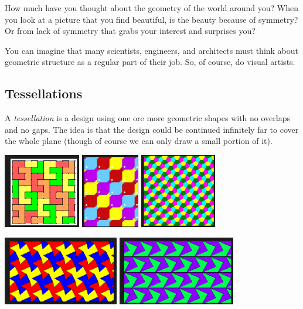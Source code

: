 How much have you thought about the geometry of the world around you?  When you look at a picture that you find beautiful, is the beauty because of symmetry?  Or from lack of symmetry that grabs your interest and surprises you?

You can imagine that many scientists, engineers, and architects must think about geometric structure as a regular part of their job.  So, of course, do visual artists.   


\subsection{Tessellations}
A \emph{tessellation} is a design using one ore more geometric shapes with no overlaps and no gaps.  The idea is that the design could be continued infinitely far to cover the whole plane (though of course we can only draw a small portion of it).  

\begin{center}\label{pic:tessagain}
\includegraphics[height=3.25cm]{tessellate2}
\qquad
\includegraphics[height=3.25cm]{tessellate5}
\qquad
\includegraphics[height=3.25cm]{tessellate6}

\bigskip

\includegraphics[height=3cm]{tessellate3}
\qquad\qquad
\includegraphics[height=3cm]{tessellate7}

\end{center}

